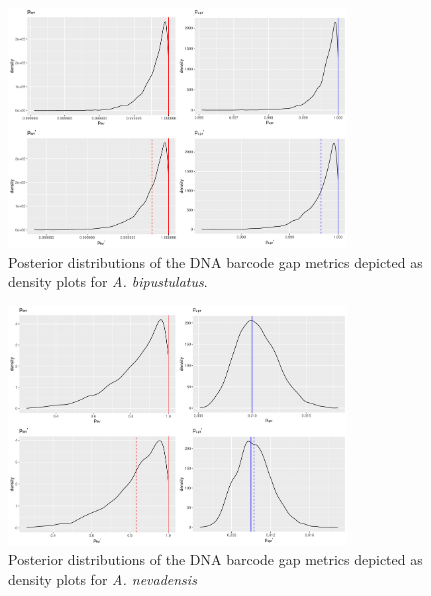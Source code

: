 \documentclass[12pt]{article}
\begin{document}
\newpage


\begin{figure}[H]

\centering

\includegraphics[width=0.80\textwidth]{Figure 5}

\caption{Posterior distributions of the DNA barcode gap metrics depicted as density plots for \textit{A. bipustulatus}.}

\end{figure}

\newpage


\begin{figure}[H]

\centering

\includegraphics[width=0.80\textwidth]{Figure 6}

\caption{Posterior distributions of the DNA barcode gap metrics depicted as density plots for \textit{A. nevadensis}}

\end{figure}
\end{document}
